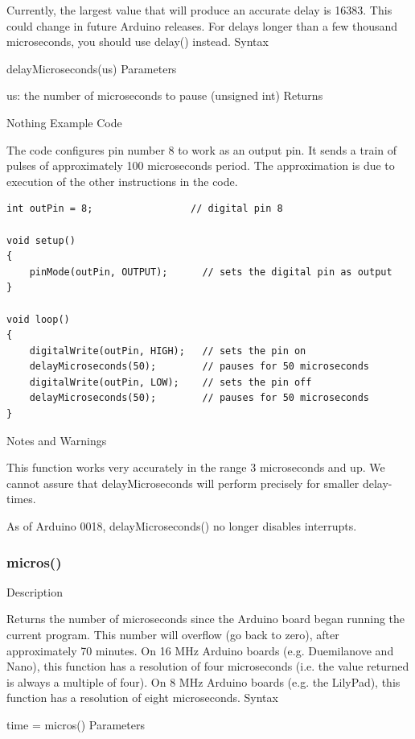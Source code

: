 \documentclass[12pt,a4paper]{report}  %
\begin{document}
Currently, the largest value that will produce an accurate delay is 16383. This could change in future Arduino releases. For delays longer than a few thousand microseconds, you should use delay() instead.
Syntax

delayMicroseconds(us)
Parameters

us: the number of microseconds to pause (unsigned int)
Returns

Nothing
Example Code

The code configures pin number 8 to work as an output pin. It sends a train of pulses of approximately 100 microseconds period. The approximation is due to execution of the other instructions in the code.

\begin{lstlisting}[label=digitalwrite,caption=delayMicroseconds]
int outPin = 8;                 // digital pin 8

void setup()
{
	pinMode(outPin, OUTPUT);      // sets the digital pin as output
}

void loop()
{
	digitalWrite(outPin, HIGH);   // sets the pin on
	delayMicroseconds(50);        // pauses for 50 microseconds
	digitalWrite(outPin, LOW);    // sets the pin off
	delayMicroseconds(50);        // pauses for 50 microseconds
}
\end{lstlisting}

Notes and Warnings

This function works very accurately in the range 3 microseconds and up. We cannot assure that delayMicroseconds will perform precisely for smaller delay-times.

As of Arduino 0018, delayMicroseconds() no longer disables interrupts.

\subsubsection{micros()}\label{micros}


Description

Returns the number of microseconds since the Arduino board began running the current program. This number will overflow (go back to zero), after approximately 70 minutes. On 16 MHz Arduino boards (e.g. Duemilanove and Nano), this function has a resolution of four microseconds (i.e. the value returned is always a multiple of four). On 8 MHz Arduino boards (e.g. the LilyPad), this function has a resolution of eight microseconds.
Syntax

time = micros()
Parameters
\end{document}

